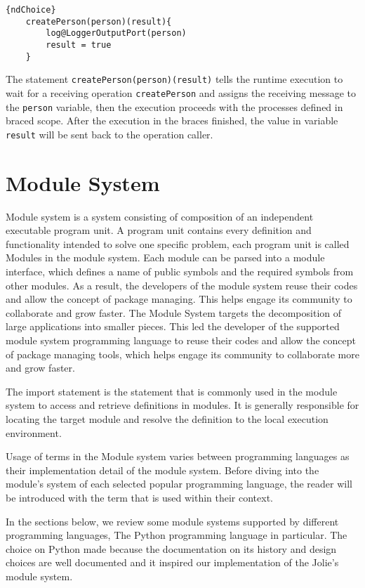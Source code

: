 \begin{lstlisting}{ndChoice}
    createPerson(person)(result){
        log@LoggerOutputPort(person)
        result = true
    }
\end{lstlisting}

The statement \texttt{createPerson(person)(result)} tells the runtime execution to wait for a receiving operation \texttt{createPerson} and assigns the receiving message to the \texttt{person} variable, then the execution proceeds with the processes defined in braced scope. After the execution in the braces finished, the value in variable \texttt{result} will be sent back to the operation caller.


\FloatBarrier






\section{Module System}

Module system is a system consisting of composition of an independent executable program unit. A program unit contains every definition and functionality intended to solve one specific problem, each program unit is called Modules in the module system. Each module can be parsed into a module interface, which defines a name of public symbols and the required symbols from other modules. 
As a result, the developers of the module system reuse their codes and allow the concept of package managing. This helps engage its community to collaborate and grow faster.
The Module System targets the decomposition of large applications into smaller pieces. This led the developer of the supported module system programming language to reuse their codes and allow the concept of package managing tools, which helps engage its community to collaborate more and grow faster.

The import statement is the statement that is commonly used in the module system to access and retrieve definitions in modules. It is generally responsible for locating the target module and resolve the definition to the local execution environment.

Usage of terms in the Module system varies between programming languages as their implementation detail of the module system. Before diving into the module's system of each selected popular programming language, the reader will be introduced with the term that is used within their context.

In the sections below, we review some module systems supported by different programming languages, The Python programming language in particular. The choice on Python made because the documentation on its history and design choices are well documented and it inspired our implementation of the Jolie's module system.


